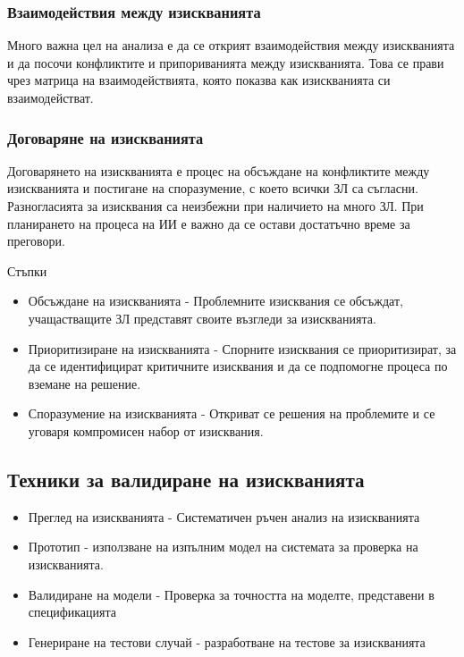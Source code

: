 \documentclass[fleqn,12pt]{article}
\begin{document}
\subsubsection{Взаимодействия между изискванията}
Много важна цел на анализа е да се открият взаимодействия между изискванията и да посочи конфликтите и припориванията между изискванията. Това се прави чрез матрица на взаимодействията, която показва как изискванията си взаимодействат.

\subsubsection{Договаряне на изискванията}
Договарянето на изискванията е процес на обсъждане на конфликтите между изискванията и постигане на споразумение, с което всички ЗЛ са съгласни. Разногласията за изисквания са неизбежни при наличието на много ЗЛ. При планирането на процеса на ИИ е важно да се остави достатъчно време за преговори.

Стъпки
\begin{itemize}
	\item Обсъждане на изискванията - Проблемните изисквания се обсъждат, учащастващите ЗЛ представят своите възгледи за изискванията.
	\item Приоритизиране на изискванията - Спорните изисквания се приоритизират, за да се идентифицират критичните изисквания и да се подпомогне процеса по вземане на решение.
	\item Споразумение на изискванията - Откриват се решения на проблемите и се уговаря компромисен набор от изисквания.
\end{itemize}

\subsection{Техники за валидиране на изискванията}

\begin{itemize}
	\item Преглед на изискванията - Систематичен ръчен анализ на изискванията 
	\item Прототип - използване на изпълним модел на системата за проверка на изискванията.
	\item Валидиране на модели - Проверка за точността на моделте, представени в спецификацията
	\item Генериране на тестови случай - разработване на тестове за изискванията
\end{itemize}
\end{document}
